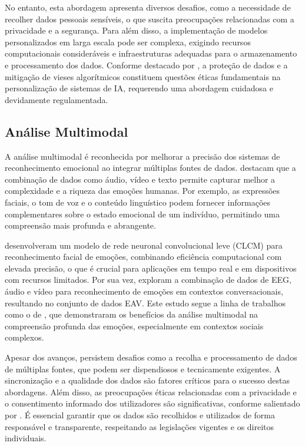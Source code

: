 \documentclass[a4paper,12pt]{report}
\begin{document}
	No entanto, esta abordagem apresenta diversos desafios, como a necessidade de recolher dados pessoais sensíveis, o que suscita preocupações relacionadas com a privacidade e a segurança. Para além disso, a implementação de modelos personalizados em larga escala pode ser complexa, exigindo recursos computacionais consideráveis e infraestruturas adequadas para o armazenamento e processamento dos dados. Conforme destacado por \textcite{mueller2020}, a proteção de dados e a mitigação de vieses algorítmicos constituem questões éticas fundamentais na personalização de sistemas de IA, requerendo uma abordagem cuidadosa e devidamente regulamentada.
	
	\subsection{Análise Multimodal}
	
	A análise multimodal é reconhecida por melhorar a precisão dos sistemas de reconhecimento emocional ao integrar múltiplas fontes de dados. \textcite{kaur2019} destacam que a combinação de dados como áudio, vídeo e texto permite capturar melhor a complexidade e a riqueza das emoções humanas. Por exemplo, as expressões faciais, o tom de voz e o conteúdo linguístico podem fornecer informações complementares sobre o estado emocional de um indivíduo, permitindo uma compreensão mais profunda e abrangente.
	
	\textcite{gursesli2024} desenvolveram um modelo de rede neuronal convolucional leve (CLCM) para reconhecimento facial de emoções, combinando eficiência computacional com elevada precisão, o que é crucial para aplicações em tempo real e em dispositivos com recursos limitados. Por sua vez, \textcite{lee2024} exploram a combinação de dados de EEG, áudio e vídeo para reconhecimento de emoções em contextos conversacionais, resultando no conjunto de dados EAV. Este estudo segue a linha de trabalhos como o de \textcite{poria2015}, que demonstraram os benefícios da análise multimodal na compreensão profunda das emoções, especialmente em contextos sociais complexos.
	
	Apesar dos avanços, persistem desafios como a recolha e processamento de dados de múltiplas fontes, que podem ser dispendiosos e tecnicamente exigentes. A sincronização e a qualidade dos dados são fatores críticos para o sucesso destas abordagens. Além disso, as preocupações éticas relacionadas com a privacidade e o consentimento informado dos utilizadores são significativas, conforme salientado por \textcite{mueller2020}. É essencial garantir que os dados são recolhidos e utilizados de forma responsável e transparente, respeitando as legislações vigentes e os direitos individuais.
	
\end{document}
